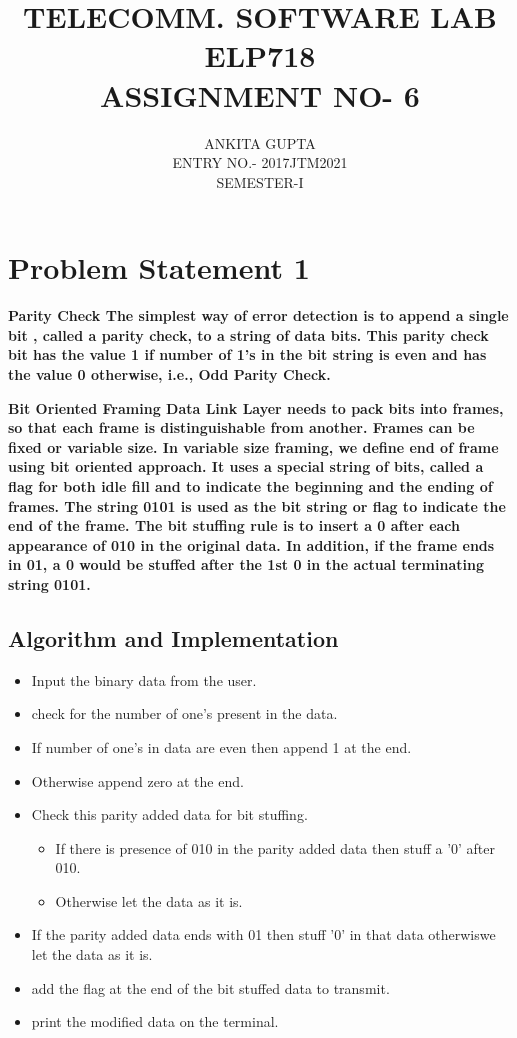 \documentclass[a4paper,10pt]{report}
\title{\bf{TELECOMM. SOFTWARE LAB ELP718 \\ ASSIGNMENT NO- 6}}
\author{ANKITA GUPTA \\ ENTRY NO.- 2017JTM2021 \\ SEMESTER-I}
\begin{document}
\maketitle

\setlength{\topmargin}{-3cm}

\tableofcontents

\newpage

\section{Problem Statement 1}
 
\bf{Parity Check}
The simplest way of error detection is to append a single bit , called a parity check, to a string of data bits. 
This parity check bit has the value 1 if number of 1’s in the bit string is even and has the value 0 otherwise, i.e., Odd Parity Check.

\bf{Bit Oriented Framing}
Data Link Layer needs to pack bits into frames, so that each frame is distinguishable from another. Frames can be fixed or variable size. 
In variable size framing, we define end of frame using bit oriented approach. It uses a special string of bits, called a flag for both idle 
fill and to indicate the beginning and the ending of frames.
The string 0101 is used as the bit string or flag to indicate the end of the frame. The bit stuffing rule is to insert a 0 after each appearance
of 010 in the original data. In addition, if the frame ends in 01, a 0 would be stuffed after the 1st 0 in the actual terminating string 0101.



\subsection{Algorithm and Implementation}



\begin{itemize}

 \item Input the binary data from the user.
 \item check for the number of one's present in the data.
 \item If number of one's in data are even then append 1 at the end.
 \item Otherwise append zero at the end.
 \item Check this parity added data for bit stuffing.
 \begin{itemize}
 \item If there is presence of 010 in the parity added data then stuff a '0' after 010.
 \item Otherwise let the data as it is.
 \end{itemize}
 \item If the parity added data ends with 01 then stuff '0' in that data otherwiswe let the data as it is.
 \item add the flag at the end of the bit stuffed data to transmit.
 \item print the modified data on the terminal.
\end{itemize}
\end{document}
